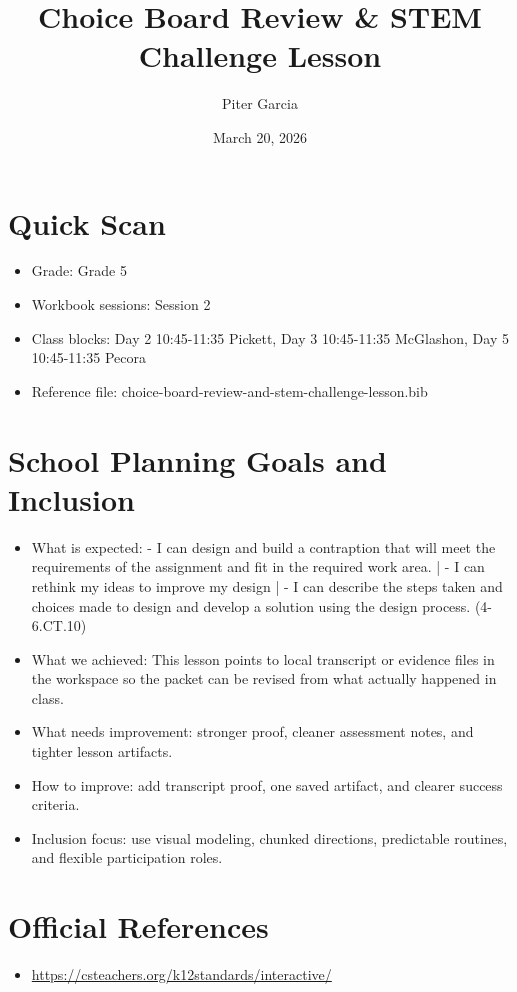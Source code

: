 \documentclass[11pt]{article}
\title{Choice Board Review & STEM Challenge Lesson}
\author{Piter Garcia}
\date{March 20, 2026}
\begin{document}
\maketitle
\section*{Quick Scan}
\begin{itemize}[leftmargin=*]
\item Grade: Grade 5
\item Workbook sessions: Session 2
\item Class blocks: Day 2 10:45-11:35 Pickett, Day 3 10:45-11:35 McGlashon, Day 5 10:45-11:35 Pecora
\item Reference file: choice-board-review-and-stem-challenge-lesson.bib
\end{itemize}
\section*{School Planning Goals and Inclusion}
\begin{itemize}[leftmargin=*]
\item What is expected: - I can design and build a contraption that will meet the requirements of the assignment and fit in the required work area. | - I can rethink my ideas to improve my design | - I can describe the steps taken and choices made to design and develop a solution using the design process. (4-6.CT.10)
\item What we achieved: This lesson points to local transcript or evidence files in the workspace so the packet can be revised from what actually happened in class.
\item What needs improvement: stronger proof, cleaner assessment notes, and tighter lesson artifacts.
\item How to improve: add transcript proof, one saved artifact, and clearer success criteria.
\item Inclusion focus: use visual modeling, chunked directions, predictable routines, and flexible participation roles.
\end{itemize}
\section*{Official References}
\begin{itemize}[leftmargin=*]
\item \url{https://csteachers.org/k12standards/interactive/}

\end{itemize}
\end{document}
